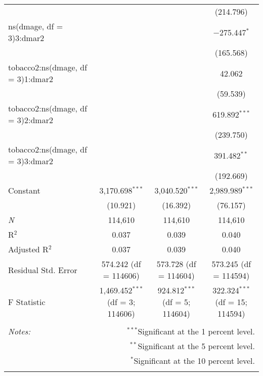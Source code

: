 \documentclass{article}
\begin{document}
\begin{table}[!htbp]
\begin{tabular}{@{\extracolsep{5pt}}lccc}
  &  &  & (214.796) \\ 
  ns(dmage, df = 3)3:dmar2 &  &  & $-$275.447$^{*}$ \\ 
  &  &  & (165.568) \\ 
  tobacco2:ns(dmage, df = 3)1:dmar2 &  &  & 42.062 \\ 
  &  &  & (59.539) \\ 
  tobacco2:ns(dmage, df = 3)2:dmar2 &  &  & 619.892$^{***}$ \\ 
  &  &  & (239.750) \\ 
  tobacco2:ns(dmage, df = 3)3:dmar2 &  &  & 391.482$^{**}$ \\ 
  &  &  & (192.669) \\ 
  Constant & 3,170.698$^{***}$ & 3,040.520$^{***}$ & 2,989.989$^{***}$ \\ 
  & (10.921) & (16.392) & (76.157) \\ 
 \textit{N} & 114,610 & 114,610 & 114,610 \\ 
R$^{2}$ & 0.037 & 0.039 & 0.040 \\ 
Adjusted R$^{2}$ & 0.037 & 0.039 & 0.040 \\ 
Residual Std. Error & 574.242 (df = 114606) & 573.728 (df = 114604) & 573.245 (df = 114594) \\ 
F Statistic & 1,469.452$^{***}$ (df = 3; 114606) & 924.812$^{***}$ (df = 5; 114604) & 322.324$^{***}$ (df = 15; 114594) \\ 
\hline 
\hline \\[-1.8ex] 
\textit{Notes:} & \multicolumn{3}{r}{$^{***}$Significant at the 1 percent level.} \\ 
 & \multicolumn{3}{r}{$^{**}$Significant at the 5 percent level.} \\ 
 & \multicolumn{3}{r}{$^{*}$Significant at the 10 percent level.} \\ 
\normalsize 
\end{tabular} 
\end{table} 
\end{document}

